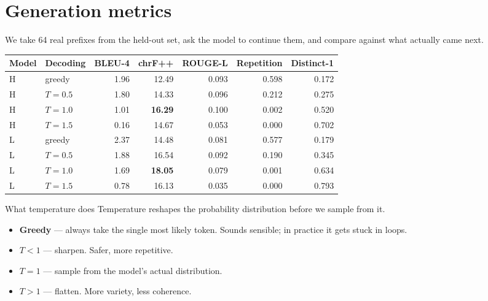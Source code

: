 \documentclass[11pt]{report}
\begin{document}
\section{Generation metrics}

We take 64 real prefixes from the held-out set, ask the model to continue them,
and compare against what actually came next.

\begin{center}
\begin{tabular}{llrrrrr}
\toprule
Model & Decoding & BLEU-4 & chrF++ & ROUGE-L & Repetition & Distinct-1 \\
\midrule
H & greedy & 1.96 & 12.49 & 0.093 & 0.598 & 0.172 \\
H & $T=0.5$ & 1.80 & 14.33 & 0.096 & 0.212 & 0.275 \\
H & $T=1.0$ & 1.01 & \textbf{16.29} & 0.100 & 0.002 & 0.520 \\
H & $T=1.5$ & 0.16 & 14.67 & 0.053 & 0.000 & 0.702 \\
\midrule
L & greedy & 2.37 & 14.48 & 0.081 & 0.577 & 0.179 \\
L & $T=0.5$ & 1.88 & 16.54 & 0.092 & 0.190 & 0.345 \\
L & $T=1.0$ & 1.69 & \textbf{18.05} & 0.079 & 0.001 & 0.634 \\
L & $T=1.5$ & 0.78 & 16.13 & 0.035 & 0.000 & 0.793 \\
\bottomrule
\end{tabular}
\end{center}

\begin{concept}{What temperature does}
Temperature reshapes the probability distribution before we sample from it.

\begin{itemize}[leftmargin=*]
\item \textbf{Greedy} --- always take the single most likely token. Sounds
      sensible; in practice it gets stuck in loops.
\item \textbf{$T < 1$} --- sharpen. Safer, more repetitive.
\item \textbf{$T = 1$} --- sample from the model's actual distribution.
\item \textbf{$T > 1$} --- flatten. More variety, less coherence.
\end{itemize}
\end{concept}
\end{document}
